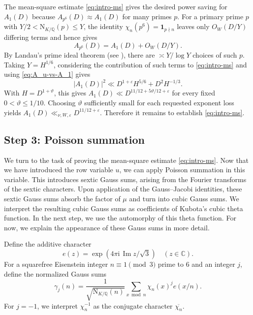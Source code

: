 \documentclass[11pt,a4paper]{article}
\numberwithin{equation}{section}
\numberwithin{figure}{section}
\theoremstyle{definition}
\theoremstyle{remark}
\newcommand{\Q}{\mathbb Q}
\newcommand{\NK}{\mathrm N_{K/\Q}}
\newcommand{\ind}{\mathbf1}
\begin{document}
The mean-square estimate \eqref{eq:intro-ms} gives the desired power saving for $A_1(D)$ because $A_{p^6}(D)\approx A_1(D)$ for many primes $p$. For a primary prime $p$ with $Y/2<\NK(p)\le Y$, the identity $\chi_n(p^6)=\ind_{p\nmid n}$ leaves only $O_W(D/Y)$ differing terms and hence gives
\begin{equation}\label{eq:A_u-vs-A_1}
 A_{p^6}(D)=A_1(D)+O_W(D/Y).
\end{equation}
By Landau's prime ideal theorem \cite{Lan03}
(see \cite[Theorem~5.33]{IK04}), there are $\asymp Y/\log Y$ choices of such $p$. Taking $Y=H^{1/6}$, considering the contribution of such terms to \eqref{eq:intro-ms} and using \eqref{eq:A_u-vs-A_1} gives
\begin{equation}\label{eq:intro-extraction}
|A_1(D)|^2
\ll D^{1+\varepsilon}H^{5/6}+D^2H^{-1/3}.
\end{equation}
With $H=D^{1+\vartheta}$, this gives
$A_1(D)\ll D^{11/12+5\vartheta/12+\varepsilon}$ for every fixed
$0<\vartheta\le1/10$. Choosing $\vartheta$
sufficiently small for each requested exponent loss yields
$A_1(D)\ll_{\nu,W,\varepsilon}D^{11/12+\varepsilon}$.
Therefore it remains to establish \eqref{eq:intro-ms}.

\subsection{Step 3: Poisson summation}

We turn to the task of proving the mean-square estimate \eqref{eq:intro-ms}. Now that we have introduced the row variable $u$, we can apply Poisson summation in this variable. This introduces sextic Gauss sums, arising from the Fourier transforms of the sextic characters. Upon application of the Gauss--Jacobi identities, these sextic Gauss sums absorb the factor of $\mu$ and turn into cubic Gauss sums. We interpret the resulting cubic Gauss sums as coefficients of Kubota's cubic theta function. In the next step, we use the automorphy of this theta function. For now, we explain the appearance of these Gauss sums in more detail.

Define the additive character
\[
 e(z)=\exp(4\pi\mathrm i\,\operatorname{Im}z/\sqrt3)\quad(z\in\mathbb C).
\]
For a squarefree Eisenstein integer $n\equiv1\pmod3$ prime to $6$ and an integer $j$, define the normalized Gauss sums
\begin{equation}\label{eq:intro-gauss-sum}
 \gamma_j(n)=\frac{1}{\sqrt{\NK(n)}}
       \sum_{x\bmod n}\chi_n(x)^j e(x/n).
\end{equation}
For $j=-1$, we interpret $\chi_n^{-1}$ as the conjugate character $\overline{\chi_n}$.
\end{document}
